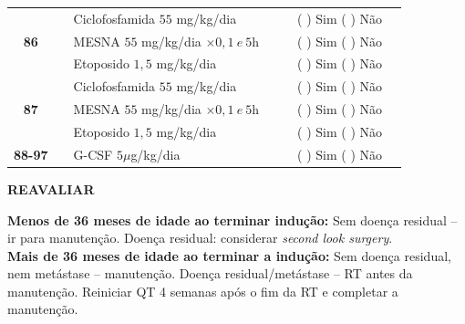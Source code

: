 \documentclass[11pt,a4paper,oldfontcommands]{memoir}
\begin{document}
\begin{center}
\begin{table}[H]
\begin{tabular}{p{1cm}c|p{4.7cm}|p{1.8cm}p{1.8cm}|c|c}
    \hline
    \multicolumn{1}{c|}{\multirow{3}{*}{\textbf{86}}}&&{Ciclofosfamida \(55\) mg/kg/dia}&{}&&{(  ) Sim (  ) Não}&\\
    \multicolumn{1}{c|}{}&&{MESNA \(55\) mg/kg/dia \(\times 0,1 \:e\: 5\)h}&&&{(  ) Sim (  ) Não}&\\
    \multicolumn{1}{c|}{}&&{Etoposido \(1,5\) mg/kg/dia}&&&{(  ) Sim (  ) Não}&\\
    \hline
    \multicolumn{1}{c|}{\multirow{3}{*}{\textbf{87}}}&&{Ciclofosfamida \(55\) mg/kg/dia}&{}&&{(  ) Sim (  ) Não}&\\
    \multicolumn{1}{c|}{}&&{MESNA \(55\) mg/kg/dia \(\times 0,1 \:e\: 5\)h}&&&{(  ) Sim (  ) Não}&\\
    \multicolumn{1}{c|}{}&\multirow{1}{*}{}&{Etoposido \(1,5\) mg/kg/dia}&{}&&{(  ) Sim (  ) Não}&\\
    \hline
    \multicolumn{1}{c|}{\textbf{88-97}}&&{G-CSF \(5 \mu\)g/kg/dia }&&&{(  ) Sim (  ) Não}&\\
    \hline
\end{tabular}
\end{table}
\normalsize
\textbf{REAVALIAR}
\end{center}
\textbf{Menos de 36 meses de idade ao terminar indução:} Sem doença residual – ir para manutenção. Doença residual: considerar \textit{second look surgery}.\\
\textbf{Mais de 36 meses de idade ao terminar a indução:} Sem doença residual, nem metástase – manutenção. Doença residual/metástase – RT antes da manutenção. Reiniciar QT 4 semanas após o fim da RT e completar a manutenção.

\clearpage
\end{document}
